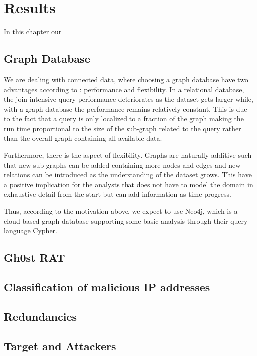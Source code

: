\chapter{Results}
In this chapter our 

\section{Graph Database}
We are dealing with connected data, where choosing a graph database have two advantages according to \citet{robinson2013}: performance and flexibility. In a relational database, the join-intensive query performance deteriorates as the dataset gets larger while, with a graph database the performance remains relatively constant. This is due to the fact that a query is only localized to a fraction of the graph making the run time proportional to the size of the sub-graph related to the query rather than the overall graph containing all available data.

Furthermore, there is the aspect of flexibility. Graphs are naturally additive \cite{robinson2013} such that new sub-graphs can be added containing more nodes and edges and new relations can be introduced as the understanding of the dataset grows. This have a positive implication for the analysts that does not have to model the domain in exhaustive detail from the start but can add information as time progress. 

Thus, according to the motivation above, we expect to use Neo4j, which is a cloud based graph database supporting some basic analysis through their query language Cypher.

\section{Gh0st RAT}

\section{Classification of malicious IP addresses}

\section{Redundancies}

\section{Target and Attackers}





